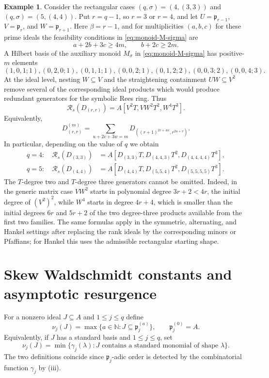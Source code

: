 \documentclass[11pt,reqno]{amsart}
\numberwithin{equation}{subsection}
\theoremstyle{definition}
\newtheorem{example}[theorem]{Example}
\theoremstyle{remark}
\newcommand{\cR}{\mathcal R}
\newcommand{\fp}{\mathfrak p}
\begin{document}
\begin{example}\label{ex:rectangular-generators}
Consider the rectangular cases $(q,\sigma)=(4,(3,3))$ and $(q,\sigma)=(5,(4,4))$. 
Put $r=q-1$, so $r=3$ or $r=4$, and let
$U=\fp_{r-1}$, $V=\fp_r$, and $W=\fp_{r+1}$.  Here
$\beta=r-1$, and for multiplicities $(a,b,c)$ for these prime ideals the feasibility
conditions in \eqref{eq:monoid-M-sigma} are
\begin{equation}\label{eq:rect-constraints}
 a+2b+3c\ge4m,\qquad b+2c\ge2m.
\end{equation}
A Hilbert basis of the auxiliary monoid $M_\sigma$ in \eqref{eq:monoid-M-sigma} has positive-$m$ elements
\[
 (1,0,1;1),(0,2,0;1),(0,1,1;1),(0,0,2;1),
 (0,1,2;2),(0,0,3;2),(0,0,4;3).
\]
At the ideal level, nesting $W\subseteq V$ and the straightening
containment $UW\subseteq V^2$ remove several of the corresponding ideal products which would produce redundant generators for the symbolic Rees ring. Thus
\[
 \cR_s(D_{(r,r)})
 =A[V^2T,VW^2T^2,W^4T^3].
\]
Equivalently,
\[
 D_{(r,r)}^{(m)}
 =\sum_{u+2v+3w=m}
 D_{((r+1)^{2v+4w},r^{2u+v})}.
\]
In particular, depending on the value of $q$ we obtain
\[
\begin{aligned}
 q=4:\quad
 \cR_s(D_{(3,3)})
 &=A[D_{(3,3)}T,D_{(4,4,3)}T^2,D_{(4,4,4,4)}T^3],\\
 q=5:\quad
 \cR_s(D_{(4,4)})
 &=A[D_{(4,4)}T,D_{(5,5,4)}T^2,D_{(5,5,5,5)}T^3].
\end{aligned}
\]
The $T$-degree two and $T$-degree three generators cannot be omitted.  Indeed, in the generic matrix case
$VW^2$ starts in polynomial degree $3r+2<4r$, the initial degree of
$(V^2)^2$, while $W^4$ starts in degree $4r+4$, which is smaller than
the initial degrees $6r$ and $5r+2$ of the two degree-three products
available from the first two families.  The same formulas apply in the symmetric, alternating, and Hankel settings after replacing the rank ideals by the corresponding minors or Pfaffians; for Hankel this uses the admissible rectangular starting shape.
\end{example}


\section{Skew Waldschmidt constants and asymptotic resurgence}\label{sec:asymptotic}


For a nonzero ideal $J\subseteq A$ and $1\le j\le q$ define 
\[
\nu_j(J)=\max\{a\in\mathbb N:J\subseteq\fp_j^{(a)}\},
\qquad \fp_j^{(0)}=A.
\]
Equivalently, if $J$ has a standard basis and 
$1\le j\le q$, set
\[
 \nu_j(J)=\min\{\gamma_j(\lambda):
   \text{$J$ contains a standard monomial of shape $\lambda$}\}.
\]
The two definitions coincide since $\fp_j$-adic order is detected by the combinatorial function $\gamma_j$ by (iii).
\end{document}
